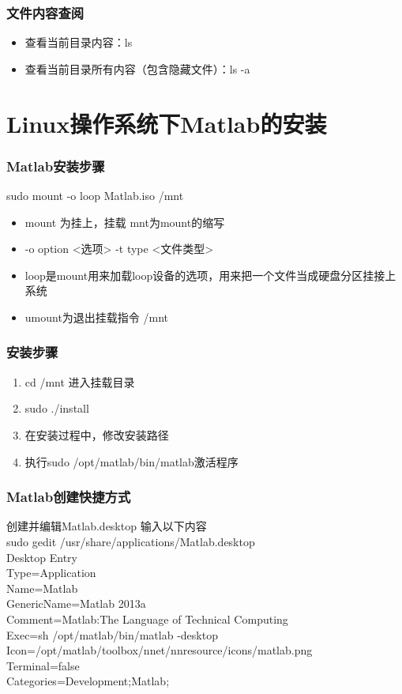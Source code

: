\documentclass[notheorems,mathserif,table,compress]{beamer}  %
\begin{document}
\begin{frame} 
  \frametitle{文件内容查阅}
  \begin{itemize}
  \item 查看当前目录内容：ls
  \item 查看当前目录所有内容（包含隐藏文件）：ls -a
  \end{itemize}
\end{frame}

\section{Linux操作系统下Matlab的安装}

\begin{frame}
  \frametitle{Matlab安装步骤}
  sudo mount -o loop Matlab.iso /mnt   
    \begin{itemize}
    \item  mount 为挂上，挂载    mnt为mount的缩写
    \item  -o option <选项>    -t  type   <文件类型>
    \item  loop是mount用来加载loop设备的选项，用来把一个文件当成硬盘分区挂接上系统 
    \item  umount为退出挂载指令  /mnt
    \end{itemize}
\end{frame}



\begin{frame}
  \frametitle{安装步骤}
  \begin{enumerate}
  \item cd /mnt  进入挂载目录 
  \item sudo ./install    
  \item 在安装过程中，修改安装路径
  \item 执行sudo /opt/matlab/bin/matlab激活程序
  \end{enumerate}
\end{frame}



\begin{frame}
 \frametitle{Matlab创建快捷方式}
  创建并编辑Matlab.desktop  输入以下内容 \\
  sudo gedit /usr/share/applications/Matlab.desktop\\
  \lbrack Desktop Entry\rbrack\\
  Type=Application\\
  Name=Matlab\\
  GenericName=Matlab 2013a\\
  Comment=Matlab:The Language of Technical Computing\\
  Exec=sh /opt/matlab/bin/matlab -desktop\\
  Icon=/opt/matlab/toolbox/nnet/nnresource/icons/matlab.png\\
  Terminal=false\\
  Categories=Development;Matlab;
\end{frame}
\end{document}
